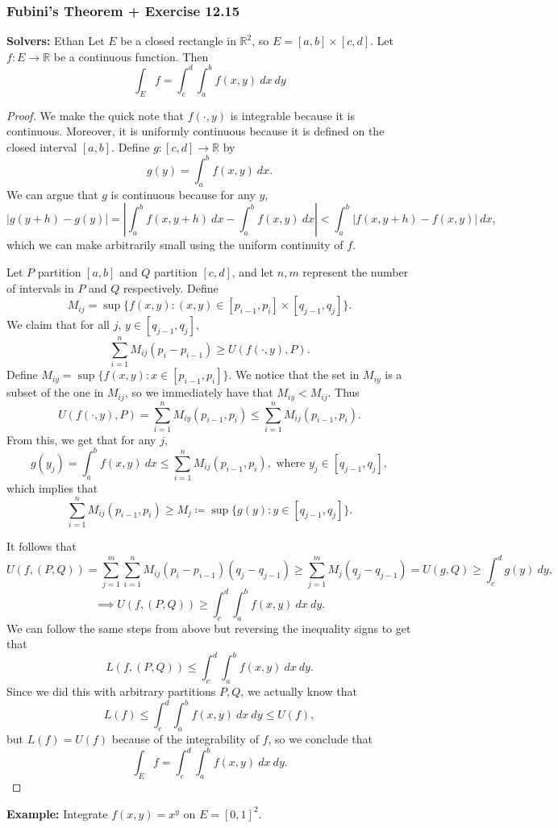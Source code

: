 \documentclass{article}
\theoremstyle{plain} %
\numberwithin{thm}{section} %
\theoremstyle{definition}
\begin{document}
    \subsubsection{Fubini's Theorem + Exercise 12.15}
    \textbf{Solvers:} Ethan
    Let \(E\) be a closed rectangle in \(\mathbb{R}^2\), so \(E = [a,b]\times [c,d]\). Let \(f: E \to \mathbb{R}\) be a continuous function. Then
    \[
        \int _E f = \int _c^d \int _a^b f(x,y)\ dx\ dy
    \]
    \begin{proof}
        We make the quick note that \(f(\cdot,y)\) is integrable because it is continuous. Moreover, it is uniformly continuous because it is defined on the closed interval \([a,b]\). Define \(g: [c,d] \to \mathbb{R}\) by
        \[
            g(y) = \int _a^b f(x,y)\ dx.
        \]
        We can argue that \(g\) is continuous because for any \(y\),
        \[
            |g(y + h) - g(y)| = \left\vert \int _a^b f(x,y + h)\ dx - \int _a^b f(x,y)\ dx\right\vert < \int _a^b |f(x, y + h) - f(x,y)|\ dx,
        \]
        which we can make arbitrarily small using the uniform continuity of \(f\).

        Let \(P\) partition \([a,b]\) and \(Q\) partition \([c,d]\), and let \(n,m\) represent the number of intervals in \(P\) and \(Q\) respectively. Define
        \[
            M_{ij} = \sup \{f(x,y) : (x,y) \in [p_{i-1}, p_i] \times [q_{j-1}, q_j]\}.
        \]
        We claim that for all \(j\), \(y \in [q_{j-1}, q_j]\),
        \[
            \sum_{i=1}^{n} M_{ij} (p_i - p_{i-1}) \geq U(f(\cdot,y), P).
        \]
        Define \(M_{iy} = \sup \{f(x,y) : x \in [p_{i-1}, p_i]\}\). We notice that the set in \(M_{iy}\) is a subset of the one in \(M_{ij}\), so we immediately have that \(M_{iy} < M_{ij}\). Thus
        \[
            U(f(\cdot, y), P) = \sum_{i=1}^{n} M_{iy} (p_{i-1}, p_i) \leq \sum_{i=1}^{n} M_{ij} (p_{i-1}, p_i).
        \]
        From this, we get that for any \(j\),
        \[
            g(y_j) = \int _a^b f(x,y)\ dx \leq \sum_{i=1}^{n} M_{ij} (p_{i-1}, p_i), \text{ where } y_j \in [q_{j-1}, q_j],
        \]
        which implies that
        \[
            \sum_{i=1}^{n} M_{ij} (p_{i-1}, p_i) \geq M_j \coloneqq \sup \{g(y) : y \in [q_{j-1}, q_j]\}.
        \]

        It follows that
        \[
            U(f,(P,Q)) = \sum_{j=1}^{m} \sum_{i=1}^{n} M_{ij} (p_i - p_{i-1})(q_j - q_{j-1}) \geq \sum_{j=1}^{m} M_j (q_j - q_{j-1}) = U(g, Q) \geq \int _c^d g(y)\ dy,
        \]
        \[
            \implies U(f,(P,Q)) \geq \int _c^d \int _a^b f(x,y)\ dx\ dy.
        \]
        We can follow the same steps from above but reversing the inequality signs to get that
        \[
            L(f,(P,Q)) \leq \int _c^d \int _a^b f(x,y)\ dx\ dy.
        \]
        Since we did this with arbitrary partitions \(P,Q\), we actually know that
        \[
            L(f) \leq \int _c^d \int _a^b f(x,y)\ dx\ dy \leq U(f),
        \]
        but \(L(f) = U(f)\) because of the integrability of \(f\), so we conclude that
        \[
            \int _E f = \int _c^d \int _a^b f(x,y)\ dx\ dy.
        \]
    \end{proof}
    \textbf{Example:} Integrate \(f(x,y) = x^y\) on \(E = [0,1]^2\).
\end{document}
